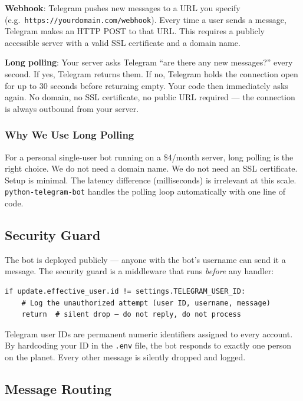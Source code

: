 \documentclass[12pt, a4paper]{article}
\begin{document}
\textbf{Webhook}: Telegram pushes new messages to a URL you specify (e.g.\ \texttt{https://yourdomain.com/webhook}). Every time a user sends a message, Telegram makes an HTTP POST to that URL. This requires a publicly accessible server with a valid SSL certificate and a domain name.

\textbf{Long polling}: Your server asks Telegram ``are there any new messages?'' every second. If yes, Telegram returns them. If no, Telegram holds the connection open for up to 30 seconds before returning empty. Your code then immediately asks again. No domain, no SSL certificate, no public URL required --- the connection is always outbound from your server.

\subsubsection{Why We Use Long Polling}

For a personal single-user bot running on a \$4/month server, long polling is the right choice. We do not need a domain name. We do not need an SSL certificate. Setup is minimal. The latency difference (milliseconds) is irrelevant at this scale. \texttt{python-telegram-bot} handles the polling loop automatically with one line of code.

\subsection{Security Guard}

The bot is deployed publicly --- anyone with the bot's username can send it a message. The security guard is a middleware that runs \textit{before} any handler:

\begin{lstlisting}
if update.effective_user.id != settings.TELEGRAM_USER_ID:
    # Log the unauthorized attempt (user ID, username, message)
    return  # silent drop — do not reply, do not process
\end{lstlisting}

Telegram user IDs are permanent numeric identifiers assigned to every account. By hardcoding your ID in the \texttt{.env} file, the bot responds to exactly one person on the planet. Every other message is silently dropped and logged.

\subsection{Message Routing}
\end{document}
